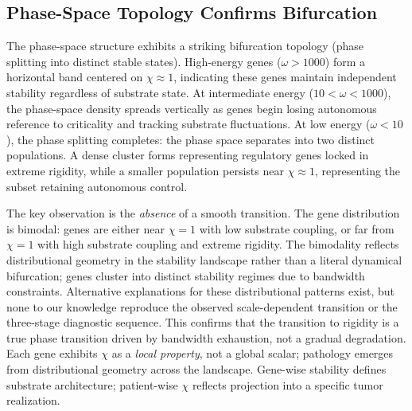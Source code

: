 \documentclass[11pt,letterpaper]{article}
\begin{document}
\subsection{Phase-Space Topology Confirms Bifurcation}

The phase-space structure exhibits a striking bifurcation topology (phase splitting into distinct stable states). High-energy genes ($\omega > 1000$) form a horizontal band centered on $\chi \approx 1$, indicating these genes maintain independent stability regardless of substrate state. At intermediate energy ($10 < \omega < 1000$), the phase-space density spreads vertically as genes begin losing autonomous reference to criticality and tracking substrate fluctuations. At low energy ($\omega < 10$), the phase splitting completes: the phase space separates into two distinct populations. A dense cluster forms representing regulatory genes locked in extreme rigidity, while a smaller population persists near $\chi \approx 1$, representing the subset retaining autonomous control.

The key observation is the \textit{absence} of a smooth transition. The gene distribution is bimodal: genes are either near $\chi = 1$ with low substrate coupling, or far from $\chi = 1$ with high substrate coupling and extreme rigidity. The bimodality reflects distributional geometry in the stability landscape rather than a literal dynamical bifurcation; genes cluster into distinct stability regimes due to bandwidth constraints. Alternative explanations for these distributional patterns exist, but none to our knowledge reproduce the observed scale-dependent transition or the three-stage diagnostic sequence. This confirms that the transition to rigidity is a true phase transition driven by bandwidth exhaustion, not a gradual degradation. Each gene exhibits $\chi$ as a \textit{local property}, not a global scalar; pathology emerges from distributional geometry across the landscape. Gene-wise stability defines substrate architecture; patient-wise $\chi$ reflects projection into a specific tumor realization.
\end{document}
